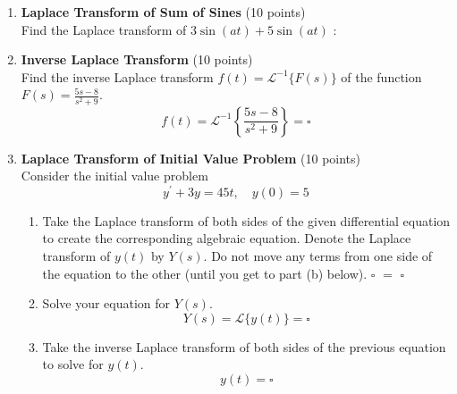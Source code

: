 \begin{enumerate}
  \item \textbf{Laplace Transform of Sum of Sines} (10 points)\\
  Find the Laplace transform of $3 \sin (a t)+5 \sin (a t)$ :
  \begin{subanswer}
  \end{subanswer}

  \item \textbf{Inverse Laplace Transform} (10 points)\\
  Find the inverse Laplace transform $f(t)=\mathcal{L}^{-1}\{F(s)\}$ of the function $F(s)=\frac{5 s-8}{s^2+9}$.
  $$
  f(t)=\mathcal{L}^{-1}\left\{\frac{5 s-8}{s^2+9}\right\}=\square
  $$
  \begin{subanswer}
  \end{subanswer}

  \item \textbf{Laplace Transform of Initial Value Problem} (10 points)\\
  Consider the initial value problem
  $$
  y^{\prime}+3 y=45 t, \quad y(0)=5
  $$
  \begin{enumerate}[label=(\alph*)]
    \item Take the Laplace transform of both sides of the given differential equation to create the corresponding algebraic equation. Denote the Laplace transform of $y(t)$ by $Y(s)$. Do not move any terms from one side of the equation to the other (until you get to part (b) below).
    $\square$ $=$ $\square$
    \begin{subanswer}
    \end{subanswer}
    \item Solve your equation for $Y(s)$.
    $$
    Y(s)=\mathcal{L}\{y(t)\}=\square
    $$
    \begin{subanswer}
    \end{subanswer}
    \item Take the inverse Laplace transform of both sides of the previous equation to solve for $y(t)$.
    $$
    y(t)=\square
    $$
    \begin{subanswer}
    \end{subanswer}
  \end{enumerate}


\end{enumerate}
